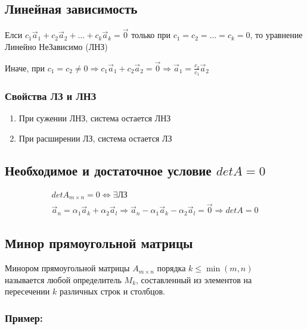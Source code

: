 \documentclass{article}
\begin{document}
\subsection{Линейная зависимость}

Елси $c_1 \vec{a}_1 + c_2 \vec{a}_2 + \dots + c_k \vec{a}_k = \vec{0}$ только при
$c_1 = c_2 = \dots = c_k = 0$, то уравнение Линейно НеЗависимо (ЛНЗ)

Иначе, при $c_1 = c_2 \ne 0 \Rightarrow c_1 \vec{a}_1 + c_2 \vec{a}_2 = \vec{0} \Rightarrow \vec{a}_1 = \frac{c_2}{c_1} \vec{a}_2$

\subsubsection{Свойства ЛЗ и ЛНЗ}

\begin{enumerate}
	\item При сужении ЛНЗ, система остается ЛНЗ
	\item При расширении ЛЗ, система остается ЛЗ
\end{enumerate}

\subsection{Необходимое и достаточное условие $det A = 0$}

\begin{gather*}
	det A_{m \times n} = 0 \Leftrightarrow \exists \text{ЛЗ} \\
	\vec{a}_n = \alpha_1 \vec{a}_k + \alpha_2 \vec{a}_l \Rightarrow
	\vec{a}_n - \alpha_1 \vec{a}_k - \alpha_2 \vec{a}_l = \vec{0} \Rightarrow det A = 0
\end{gather*}

\subsection{Минор прямоугольной матрицы}

Минором прямоугольной матрицы $A_{m \times n}$ порядка $k \le \min(m, n)$ \\
называется любой определитель $M_k$, составленный из элементов на \\
пересечении $k$ различных строк и столбцов.

\subsubsection*{Пример:}
\end{document}
